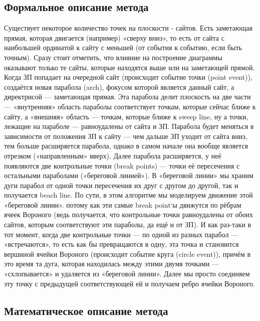 \documentclass[ a4paper]{article}
\begin{document}
\subsection{Формальное описание метода}
Существует некоторое количество точек на плоскости - сайтов. Есть заметающая прямая, которая двигается (например) «сверху вниз», то есть от сайта с наибольшей ординатой к сайту с меньшей (от события к событию, если быть точным). Сразу стоит отметить, что влияние на построение диаграммы оказывают только те сайты, которые находятся выше или на заметающей прямой.
Когда ЗП попадает на очередной сайт (происходит событие точки (point event)), создаётся новая парабола (arch), фокусом которой является данный сайт, а директрисой — заметающая прямая. Эта парабола делит плоскость на две части — «внутренняя» область параболы соответствует точкам, которые сейчас ближе к сайту, а «внешняя» область — точкам, которые ближе к sweep line, ну а точки, лежащие на параболе — равноудалены от сайта и ЗП. Парабола будет меняться в зависимости от положения ЗП к сайту — чем дальше ЗП уходит от сайта вниз, тем больше расширяется парабола, однако в самом начале она вообще является отрезком («направленным» вверх). Далее парабола расширяется, у неё появляются две контрольные точки (break points) — точки её пересечения с остальными параболами («береговой линией»). В «береговой линии» мы храним дуги парабол от одной точки пересечения их друг с другом до другой, так и получается beach line. По сути, в этом алгоритме мы моделируем движение этой «береговой линии». потому как эти самые break point`ы движутся по рёбрам ячеек Вороного (ведь получается, что контрольные точки равноудалены от обоих сайтов, которым соответствуют эти параболы, да ещё и от ЗП).
И как раз-таки в тот момент, когда две контрольные точки — по одной из разных парабол — «встречаются», то есть как бы превращаются в одну, эта точка и становится вершиной ячейки Вороного (происходит событие круга (circle event)), причём в это время та дуга, которая находилась между этими двумя точками — «схлопывается» и удаляется из «береговой линии». Далее мы просто соединяем эту точку с предыдущей соответствующей ей и получаем ребро ячейки Вороного.

\newpage
\subsection{Математическое описание метода}
\end{document}
